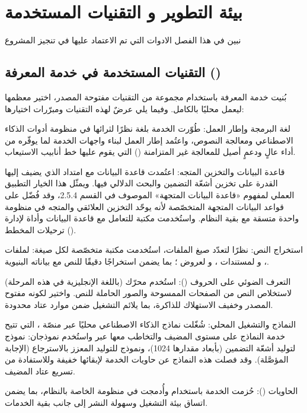 \chapter{بيئة التطوير و التقنيات المستخدمة}

\begin{chaptersummary}
نبين في هذا الفصل الادوات التي تم الاعتماد عليها في تنجيز المشروع
\end{chaptersummary}

\section{التقنيات المستخدمة في خدمة المعرفة ()}

بُنيت خدمة المعرفة باستخدام مجموعة من التقنيات مفتوحة المصدر، اختير معظمها ليعمل محليًا بالكامل. وفيما يلي عرضٌ لهذه التقنيات ومبرّرات اختيارها:

لغة البرمجة وإطار العمل: طُوّرت الخدمة بلغة  نظرًا لثرائها في منظومة أدوات الذكاء الاصطناعي ومعالجة النصوص، واعتُمد إطار العمل  لبناء واجهات الخدمة لما يوفّره من أداء عالٍ ودعمٍ أصيل للمعالجة غير المتزامنة () التي يقوم عليها خط أنابيب الاستيعاب.

قاعدة البيانات والتخزين المتجه: اعتُمدت قاعدة البيانات  مع امتداد  الذي يضيف إليها القدرة على تخزين أشعّة التضمين والبحث الدلالي فيها. ويمثّل هذا الخيار التطبيق العملي لمفهوم «قاعدة البيانات المتجهة» الموصوف في القسم 2.5.4، وقد فُضّل على قواعد البيانات المتجهة المتخصّصة لأنه يوحّد التخزين العلائقي والمتجه في منظومة واحدة متسقة مع بقية النظام. واستُخدمت مكتبة  للتعامل مع قاعدة البيانات وأداة  لإدارة ترحيلات المخطط ().

استخراج النص: نظرًا لتعدّد صيغ الملفات، استُخدمت مكتبة متخصّصة لكل صيغة:  لملفات ، و لمستندات ، و لعروض ؛ بما يضمن استخراجًا دقيقًا للنص مع بياناته البنيوية.

التعرف الضوئي على الحروف (): استُخدم محرّك  (باللغة الإنجليزية في هذه المرحلة) لاستخلاص النص من الصفحات الممسوحة والصور الحاملة للنص. واختير لكونه مفتوح المصدر وخفيف الاستهلاك للذاكرة، بما يلائم التشغيل ضمن موارد عتاد محدودة.

النماذج والتشغيل المحلي: شُغّلت نماذج الذكاء الاصطناعي محليًا عبر منصّة ، التي تتيح خدمة النماذج على مستوى المضيف والتخاطب معها عبر  واستُخدم نموذجان: نموذج  لتوليد أشعّة التضمين (بأبعاد مقدارها 1024)، ونموذج  للتوليد المعزز بالاسترجاع (الإجابة المؤصَّلة). وقد فصلت هذه النماذج عن حاويات الخدمة لإبقائها خفيفة وللاستفادة من تسريع عتاد المضيف.

الحاويات (): حُزمت الخدمة باستخدام  وأُدمجت في منظومة  الخاصة بالنظام، بما يضمن اتساق بيئة التشغيل وسهولة النشر إلى جانب بقية الخدمات.
